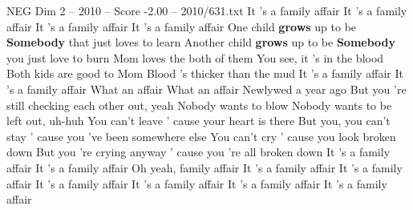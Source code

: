 \begin{textsample}{NEG Dim 2 – 2010 – Score -2.00 – 2010/631.txt}  \label{ex:f2_neg_012}
It 's a family affair It 's a family affair It 's a family affair It 's a family affair One child \textbf{grows} up to be \textbf{Somebody} that just loves to learn Another child \textbf{grows} up to be \textbf{Somebody} you just love to burn Mom loves the both of them You see, it 's in the blood Both kids are good to Mom Blood 's thicker than the mud It 's a family affair It 's a family affair What an affair What an affair Newlywed a year ago But you 're still checking each other out, yeah Nobody wants to blow Nobody wants to be left out, uh-huh You can't leave ' cause your heart is there But you, you can't stay ' cause you 've been somewhere else You can't cry ' cause you look broken down But you 're crying anyway ' cause you 're all broken down It 's a family affair It 's a family affair Oh yeah, family affair It 's a family affair It 's a family affair It 's a family affair It 's a family affair It 's a family affair It 's a family affair

\end{textsample}
